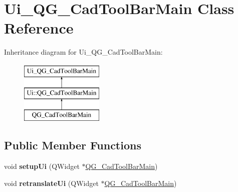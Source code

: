 \hypertarget{classUi__QG__CadToolBarMain}{\section{Ui\-\_\-\-Q\-G\-\_\-\-Cad\-Tool\-Bar\-Main Class Reference}
\label{classUi__QG__CadToolBarMain}
}
Inheritance diagram for Ui\-\_\-\-Q\-G\-\_\-\-Cad\-Tool\-Bar\-Main\-:\begin{figure}[H]
\begin{center}
\leavevmode
\includegraphics[height=3.000000cm]{classUi__QG__CadToolBarMain}
\end{center}
\end{figure}
\subsection*{Public Member Functions}
\begin{DoxyCompactItemize}
\item 
\hypertarget{classUi__QG__CadToolBarMain_aba55a7ff2145eae8e35174484b44ef7d}{void {\bfseries setup\-Ui} (Q\-Widget $\ast$\hyperlink{classQG__CadToolBarMain}{Q\-G\-\_\-\-Cad\-Tool\-Bar\-Main})}\label{classUi__QG__CadToolBarMain_aba55a7ff2145eae8e35174484b44ef7d}

\item 
\hypertarget{classUi__QG__CadToolBarMain_a2546b4bdc6df6696f216827a64d7f425}{void {\bfseries retranslate\-Ui} (Q\-Widget $\ast$\hyperlink{classQG__CadToolBarMain}{Q\-G\-\_\-\-Cad\-Tool\-Bar\-Main})}\label{classUi__QG__CadToolBarMain_a2546b4bdc6df6696f216827a64d7f425}

\end{DoxyCompactItemize}
